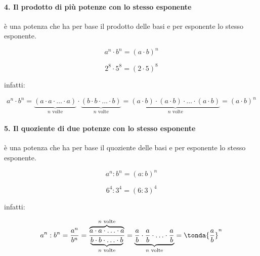 \paragraph{4. Il prodotto di più potenze con lo stesso esponente} 
è una potenza che ha per base il prodotto delle basi e per esponente lo stesso
esponente.

\begin{minipage}[h]{.35\textwidth}
\vspace{4.5mm}
\[\boxed{a^n\cdot b^n=(a\cdot b)^n}\]
\end{minipage}\hfil
\begin{minipage}[h]{.35\textwidth}
\[2^8\cdot 5^8=(2\cdot 5)^8\]
\end{minipage}
\hfil
\begin{minipage}[c]{.25\textwidth}
\vspace{4.5mm}
\centering infatti:
\end{minipage}
\[a^n \cdot b^n=
  \underbrace{(a\cdot a\cdot\ldots\cdot a)}_{n\text{ volte}}\cdot%
  \underbrace{(b\cdot b\cdot\ldots\cdot b)}_{n\text{ volte}}=
  \underbrace{(a\cdot b)\cdot(a\cdot b)\cdot\ldots\cdot
              (a\cdot b)}_{n\text{ volte}}=
   (a\cdot b)^n\]
\vspace{-1.5em}
\paragraph{5. Il quoziente di due potenze con lo stesso esponente} 
è una potenza che ha per base il quoziente delle basi e per esponente lo 
stesso esponente.

\begin{minipage}[h]{.35\textwidth}
\vspace{4.5mm}
\[\boxed{a^n:b^n=(a:b)^n}\]
\end{minipage}\hfil
\begin{minipage}[h]{.35\textwidth}
\[6^4:3^4=(6:3)^4\]
\end{minipage}
\hfil
\begin{minipage}[c]{.25\textwidth}
\vspace{4.5mm}
\centering infatti:
\end{minipage}
\[a^n : b^n = \frac{a^n}{b^n} = 
  \frac{\overbrace{a\cdot a\cdot\ldots\cdot a}^{n\text{ volte}} }
       {\underbrace{b\cdot b\cdot\ldots\cdot b}_{n\text{ volte}}}=
  \underbrace{\frac{a}{b}\cdot \frac{a}{b}\cdot\ldots\cdot
              \frac{a}{b}}_{n\text{ volte}}=
   \tonda{\frac{a}{b}}^n\]

